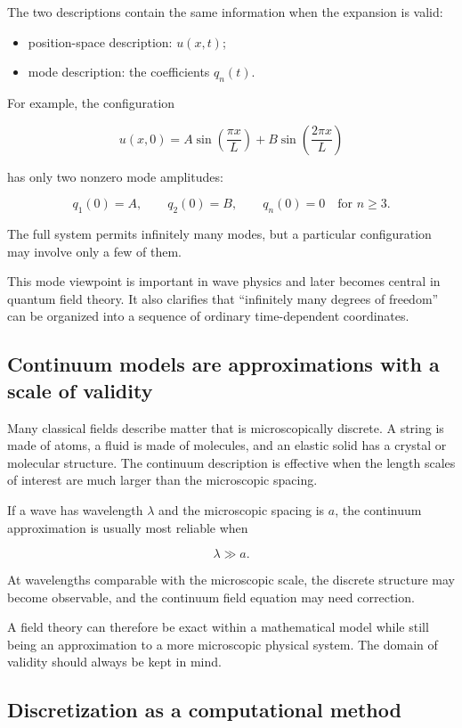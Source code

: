 The two descriptions contain the same information when the expansion is valid:

\begin{itemize}
    \item position-space description: \(u(x,t)\);
    \item mode description: the coefficients \(q_{n}(t)\).
\end{itemize}

For example, the configuration

\[
u(x,0)
=
A\sin\left(\frac{\pi x}{L}\right)
+
B\sin\left(\frac{2\pi x}{L}\right)
\]

has only two nonzero mode amplitudes:

\[
q_{1}(0)=A,
\qquad
q_{2}(0)=B,
\qquad
q_{n}(0)=0\quad\text{for }n\geq 3.
\]

The full system permits infinitely many modes, but a particular configuration may involve only a few of them.

This mode viewpoint is important in wave physics and later becomes central in quantum field theory. It also clarifies that ``infinitely many degrees of freedom'' can be organized into a sequence of ordinary time-dependent coordinates.

\subsection{Continuum models are approximations with a scale of validity}

Many classical fields describe matter that is microscopically discrete. A string is made of atoms, a fluid is made of molecules, and an elastic solid has a crystal or molecular structure. The continuum description is effective when the length scales of interest are much larger than the microscopic spacing.

If a wave has wavelength \(\lambda\) and the microscopic spacing is \(a\), the continuum approximation is usually most reliable when

\[
\lambda\gg a.
\]

At wavelengths comparable with the microscopic scale, the discrete structure may become observable, and the continuum field equation may need correction.

A field theory can therefore be exact within a mathematical model while still being an approximation to a more microscopic physical system. The domain of validity should always be kept in mind.

\subsection{Discretization as a computational method}

